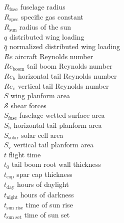 \begin{multicols}{2}
\begin{tabbing}
$R_{\text{fuse}}$ \> fuselage radius \\ %
$R_{\text{spec}}$ \> specific gas constant \\ %
$R_{\text{sun}}$ \> radius of the sun \\
$q$ \> distributed wing loading \\ %
$\bar{q}$ \> normalized distributed wing loading \\
$Re$ \> aircraft Reynolds number \\
$Re_{\text{boom}}$ \> tail boom Reynolds number \\
$Re_{\text{h}}$ \> horizontal tail Reynolds number \\
$Re_{\text{v}}$ \> vertical tail Reynolds number \\
$S$ \> wing planform area \\ %
$\mathcal{S}$ \> shear forces \\ %
$S_{\text{fuse}}$ \> fuselage wetted surface area \\ %
$S_{\text{h}}$ \> horizontal tail planform area \\ %
$S_{\text{solar}}$ \> solar cell area \\ %
$S_{\text{v}}$ \> vertical tail planform area \\ %
$t$ \> flight time \\ %
$t_0$ \> tail boom root wall thickness \\ %
$t_{\text{cap}}$ \> spar cap thickness \\ %
$t_{\text{day}}$ \> hours of daylight \\ %
$t_{\text{night}}$ \> hours of darkness \\ %
$t_{\text{sun rise}}$ \> time of sun rise \\ %
$t_{\text{sun set}}$ \> time of sun set \\ %

\end{tabbing}
\end{multicols}
